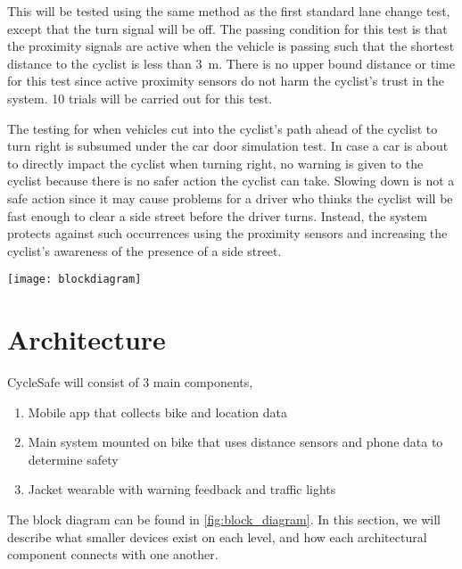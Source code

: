 \documentclass[journal]{IEEEtran}
\begin{document}
This will be tested using the same method as the first standard lane change test, except that the turn signal will be off. The passing condition for this test is that the proximity signals are active when the vehicle is passing such that the shortest distance to the cyclist is less than \SI{3}{\meter}. There is no upper bound distance or time for this test since active proximity sensors do not harm the cyclist's trust in the system. 10 trials will be carried out for this test.

The testing for when vehicles cut into the cyclist's path ahead of the cyclist to turn right is subsumed under the car door simulation test. In case a car is about to directly impact the cyclist when turning right, no warning is given to the cyclist because there is no safer action the cyclist can take. Slowing down is not a safe action since it may cause problems for a driver who thinks the cyclist will be fast enough to clear a side street before the driver turns. Instead, the system protects against such occurrences using the proximity sensors and increasing the cyclist's awareness of the presence of a side street.


\begin{figure*}
    \centering
    \texttt{[image: blockdiagram]}
    \caption{Block Diagram Showing the Architecture of CycleSafe}
    \label{fig:block_diagram}
\end{figure*}
\section{Architecture}
CycleSafe will consist of 3 main components,
\begin{enumerate}
    \item Mobile app that collects bike and location data
    \item Main system mounted on bike that uses distance sensors and phone data to determine safety
    \item Jacket wearable with warning feedback and traffic lights
\end{enumerate}
The block diagram can be found in \ref{fig:block_diagram}. In this section, we will describe what smaller devices exist on each level, and how each architectural component connects with one another.
\end{document}
